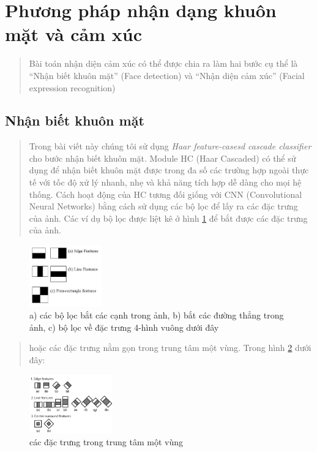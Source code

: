 \documentclass{article}
\begin{document}
\section{Phương pháp nhận dạng khuôn mặt và cảm xúc}
\begin{quote}
   Bài toán nhận diện cảm xúc có thể được chia ra làm hai bước cụ thể là “Nhận biết khuôn mặt” (Face detection) và “Nhận diện cảm xúc” (Facial expression recognition)   
\end{quote}

\subsection{Nhận biết khuôn mặt}
\begin{quote}
   Trong bài viết này chúng tôi sử dụng \textit{Haar feature-casesd cascade classifier} \cite{HaarCascade} cho bước nhận biết khuôn mặt.
   Module HC (Haar Cascaded) có thể sử dụng để nhận biết khuôn mặt được trong đa số các trường hợp ngoài thực tế với tốc độ xử lý nhanh, nhẹ và khả năng tích hợp dễ dàng cho mọi hệ thống. Cách hoạt động của HC tương đối giống với CNN (Convolutional Neural Networks) bằng cách sử dụng các bộ lọc để lấy ra các đặc trưng của ảnh. Các ví dụ bộ lọc được liệt kê ở hình \ref{fig:feat1} để bắt được các đặc trưng của ảnh.
\end{quote}
\begin{figure}[H]
   \centering
   \includegraphics[width=0.28\textwidth]{haar_features.jpg}   
   \caption{a) các bộ lọc bắt các cạnh trong ảnh, b) bắt các đường thẳng trong ảnh, c) bộ lọc về đặc trưng 4-hình vuông dưới đây}
   \label{fig:feat1}
\end{figure}
\begin{quote}
   hoặc các đặc trưng nằm gọn trong trung tâm một vùng. Trong hình \ref{fig:feat2} dưới đây:
\end{quote}
\begin{figure}[H]
   \centering
   \includegraphics[width=0.32\textwidth]{haar_cas2.png}   
   \caption{các đặc trưng trong trung tâm một vùng}
   \label{fig:feat2}
\end{figure}
\end{document}
